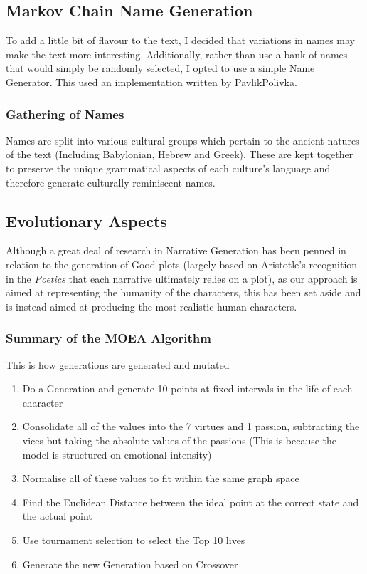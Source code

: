 \documentclass[11pt]{article}
\begin{document}
\subsection{Markov Chain Name Generation}
To add a little bit of flavour to the text, I decided that variations in names may make the text more interesting. Additionally, rather than use a bank of names that would simply be randomly selected, I opted to use a simple Name Generator. This used an implementation written by PavlikPolivka.

\subsubsection{Gathering of Names}
Names are split into various cultural groups which pertain to the ancient natures of the text (Including Babylonian, Hebrew and Greek). These are kept together to preserve the unique grammatical aspects of each culture's language and therefore generate culturally reminiscent names. 

\subsection{Evolutionary Aspects}
Although a great deal of research in Narrative Generation has been penned in relation to the generation of Good plots (largely based on Aristotle's recognition in the \textit{Poetics} that each narrative ultimately relies on a plot), as our approach is aimed at representing the humanity of the characters, this has been set aside and is instead aimed at producing the most realistic human characters. 

\subsubsection{Summary of the MOEA Algorithm}
This is how generations are generated and mutated\:
\begin{enumerate}
	\item Do a Generation and generate 10 points at fixed intervals in the life of each character
	\item Consolidate all of the values into the 7 virtues and 1 passion, subtracting the vices but taking the absolute values of the passions (This is because the model is structured on emotional intensity)
	\item Normalise all of these values to fit within the same graph space
	\item Find the Euclidean Distance between the ideal point at the correct state and the actual point
	\item Use tournament selection to select the Top 10 lives
	\item Generate the new Generation based on Crossover
\end{enumerate}
\end{document}
